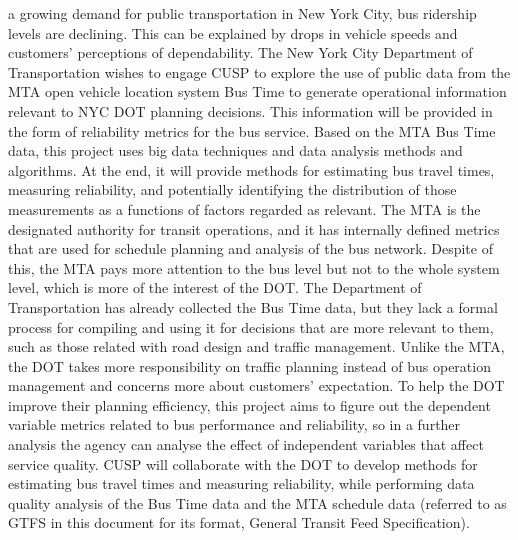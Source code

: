 \documentclass[12pt,journal,compsoc]{IEEEtran}
\begin{document}
% 
% 
% 
% 
 a growing demand for public transportation in New York City, bus ridership levels are declining. This can be explained by drops in vehicle speeds and customers’ perceptions of dependability. The New York City Department of Transportation wishes to engage CUSP to explore the use of public data from the MTA open vehicle location system Bus Time to generate operational information relevant to NYC DOT planning decisions. This information will be provided in the form of reliability metrics for the bus service.
Based on the MTA Bus Time data, this project uses big data techniques and data analysis methods and algorithms. At the end, it will provide methods for estimating bus travel times, measuring reliability, and potentially identifying the distribution of those measurements as a functions of factors regarded as relevant.
The MTA is the designated authority for transit operations, and it has internally defined metrics that are used for schedule planning and analysis of the bus network. Despite of this, the MTA pays more attention to the bus level but not to the whole system level, which is more of the interest of the DOT. The Department of Transportation has already collected the Bus Time data, but they lack a formal process for compiling and using it for decisions that are more relevant to them, such as those related with road design and traffic management. 
Unlike the MTA, the DOT takes more responsibility on traffic planning instead of bus operation management and concerns more about customers’ expectation. To help the DOT improve their planning efficiency, this project aims to figure out the dependent variable metrics related to bus performance and reliability, so in a further analysis the agency can analyse the effect of independent variables that affect service quality. CUSP will collaborate with the DOT to develop methods for estimating bus travel times and measuring reliability, while performing data quality analysis of the Bus Time data and the MTA schedule data (referred to as GTFS in this document for its format, General Transit Feed Specification).
\end{document}
